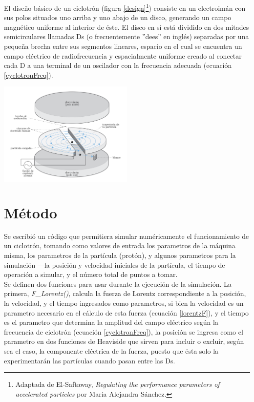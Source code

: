 \documentclass[letterpaper, 11pt]{article}
\begin{document}
\begin{multicols}{2}
El diseño básico de un ciclotrón (figura \ref{design}\footnote{Adaptada de El-Saftaway, \textit{Regulating the performance parameters of accelerated particles} por María Alejandra Sánchez.}) consiste en un electroimán con sus polos situados uno arriba y uno abajo de un disco, generando un campo magnético uniforme al interior de éste. El disco en sí está dividido en dos mitades semicirculares llamadas Ds (o frecuentemente ''dees'' en inglés) separadas por una pequeña brecha entre sus segmentos lineares, espacio en el cual se encuentra un campo eléctrico de radiofrecuencia y espacialmente uniforme creado al conectar cada D a una terminal de un oscilador con la frecuencia adecuada (ecuación \ref{cyclotronFreq}).\\

\begin{center}
    \includegraphics[width=0.5\textwidth]{design.png}
    \label{design}
\end{center}

\section{Método}
Se escribió un código que permitiera simular numéricamente el funcionamiento de un ciclotrón, tomando como valores de entrada los parametros de la máquina misma, los parametros de la partícula (protón), y algunos parametros para la simulación ---la posición y velocidad iniciales de la partícula, el tiempo de operación a simular, y el número total de puntos a tomar.\\

Se definen dos funciones para usar durante la ejecución de la simulación. La primera, \textit{F\_Lorentz()}, calcula la fuerza de Lorentz correspondiente a la posición, la velocidad, y el tiempo ingresados como parametros, si bien la velocidad es un parametro necesario en el cálculo de esta fuerza (ecuación \ref{lorentzF}), y el tiempo es el parametro que determina la amplitud del campo eléctrico según la frecuencia de ciclotrón (ecuación \ref{cyclotronFreq}), la posición se ingresa como el parametro en dos funciones de Heaviside que sirven para incluir o excluir, según sea el caso, la componente eléctrica de la fuerza, puesto que ésta solo la experimentarán las partículas cuando pasan entre las Ds.


\end{multicols}
\end{document}
